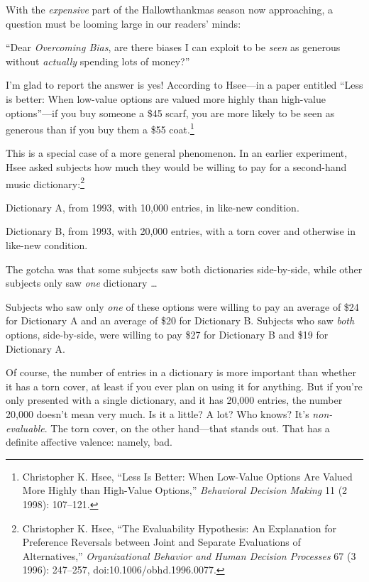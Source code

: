 \myendsectiontext


\bigskip


{
 With the \textit{expensive} part of the Hallowthankmas season now
approaching, a question must be looming large in our
readers' minds:}

{
 ``Dear \textit{Overcoming Bias}, are there biases
I can exploit to be \textit{seen} as generous without \textit{actually}
spending lots of money?''}

{
 I'm glad to report the answer is yes! According to
Hsee---in a paper entitled ``Less is better: When
low-value options are valued more highly than high-value
options''---if you buy someone a \$45 scarf, you are
more likely to be seen as generous than if you buy them a \$55
coat.\footnote{Christopher K. Hsee, ``Less Is Better: When
Low-Value Options Are Valued More Highly than High-Value
Options,'' \textit{Behavioral Decision Making} 11 (2
1998): 107--121.}}

{
 This is a special case of a more general phenomenon. In an earlier
experiment, Hsee asked subjects how much they would be willing to pay
for a second-hand music dictionary:\footnote{Christopher K. Hsee, ``The Evaluability
Hypothesis: An Explanation for Preference Reversals between Joint and
Separate Evaluations of Alternatives,''
\textit{Organizational Behavior and Human Decision Processes} 67 (3
1996): 247--257, doi:10.1006/obhd.1996.0077.}}

{
 Dictionary A, from 1993, with 10,000 entries, in like-new
condition.}

{
 Dictionary B, from 1993, with 20,000 entries, with a torn cover
and otherwise in like-new condition.}

{
 The gotcha was that some subjects saw both dictionaries
side-by-side, while other subjects only saw \textit{one} dictionary
\ldots}

{
 Subjects who saw only \textit{one} of these options were willing
to pay an average of \$24 for Dictionary A and an average of \$20 for
Dictionary B. Subjects who saw \textit{both} options, side-by-side,
were willing to pay \$27 for Dictionary B and \$19 for Dictionary A.}

{
 Of course, the number of entries in a dictionary is more important
than whether it has a torn cover, at least if you ever plan on using it
for anything. But if you're only presented with a
single dictionary, and it has 20,000 entries, the number 20,000
doesn't mean very much. Is it a little? A lot? Who
knows? It's \textit{non-evaluable}. The torn cover, on
the other hand---that stands out. That has a definite affective
valence: namely, bad.}

